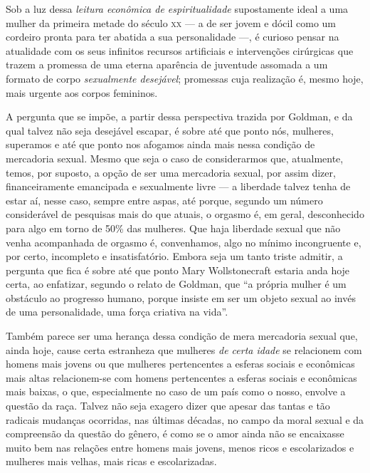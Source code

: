 Sob a luz dessa \textit{leitura econômica de espiritualidade}
supostamente ideal a uma mulher da primeira metade do século \textsc{xx} --- a de
ser jovem e dócil como um cordeiro pronta para ter abatida a sua
personalidade ---, é curioso pensar na atualidade com os seus infinitos
recursos artificiais e intervenções cirúrgicas que trazem a promessa de
uma eterna aparência de juventude assomada a um formato de corpo
\textit{sexualmente desejável}; promessas cuja realização é, mesmo hoje, mais
urgente aos corpos femininos.

A pergunta que se impõe, a partir dessa
perspectiva trazida por Goldman, e da qual talvez não seja desejável
escapar, é sobre até que ponto nós, mulheres, superamos e até que
ponto nos afogamos ainda mais nessa condição de mercadoria sexual. Mesmo
que seja o caso de considerarmos que, atualmente, temos, por suposto, a
opção de ser uma mercadoria sexual, por assim dizer, financeiramente
emancipada e sexualmente livre --- a liberdade talvez tenha de estar
aí, nesse caso, sempre entre aspas, até porque, segundo um número
considerável de pesquisas mais do que atuais, o orgasmo é, em geral,
desconhecido para algo em torno de 50\% das mulheres. Que haja liberdade
sexual que não venha acompanhada de orgasmo é, convenhamos, algo no
mínimo incongruente e, por certo, incompleto e insatisfatório. Embora
seja um tanto triste admitir, a pergunta que fica é sobre até que
ponto Mary Wollstonecraft estaria anda hoje certa, ao enfatizar, segundo
o relato de Goldman, que ``a própria mulher é um obstáculo ao progresso
humano, porque insiste em ser um objeto sexual ao invés de uma
personalidade, uma força criativa na vida''.

Também parece ser uma herança dessa condição de mera mercadoria sexual
que, ainda hoje, cause certa estranheza que mulheres \textit{de certa idade}
se relacionem com homens mais jovens ou que mulheres pertencentes a
esferas sociais e econômicas mais altas relacionem-se com homens
pertencentes a esferas sociais e econômicas mais baixas, o que,
especialmente no caso de um país como o nosso, envolve a questão da
raça. Talvez não seja exagero dizer que apesar das tantas e tão radicais
mudanças ocorridas, nas últimas décadas, no campo da moral sexual e da
compreensão da questão do gênero, é como se o amor ainda não se
encaixasse muito bem nas relações entre homens mais jovens, menos ricos
e escolarizados e mulheres mais velhas, mais ricas e escolarizadas.

